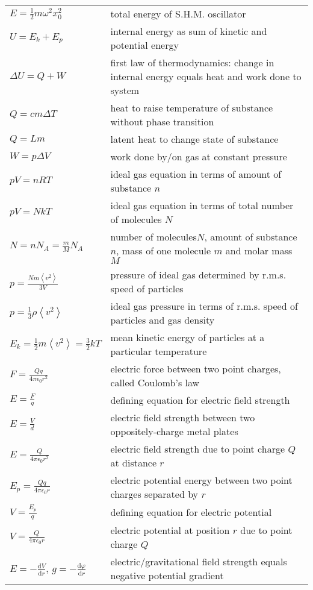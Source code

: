 {{\begin{longtable}{p{} p{}}
	$E=\frac{1}{2}m\omega^2 x_0^2$ & total energy of S.H.M. oscillator \\
	$U=E_k+E_p$ & internal energy as sum of kinetic and potential energy \\
	$\Delta U = Q + W$ & first law of thermodynamics: change in internal energy equals heat and work done to system \\
	$Q=cm\Delta T$ & heat to raise temperature of substance without phase transition \\
	$Q=Lm$ & latent heat to change state of substance \\
	$W=p\Delta V$ & work done by/on gas at constant pressure \\
	$pV=nRT$ & ideal gas equation in terms of amount of substance $n$\\
	$pV=NkT$ & ideal gas equation in terms of total number of molecules $N$\\
	$N=nN_A=\frac{m}{M}N_A$ & number of molecules$N$, amount of substance $n$, mass of one molecule $m$ and molar mass $M$ \\
	$p=\frac{Nm\left<v^2\right>}{3V}$ & pressure of ideal gas determined by r.m.s. speed of particles \\
	$p=\frac{1}{3}\rho\left<v^2\right>$ & ideal gas pressure in terms of r.m.s. speed of particles and gas density \\
	$E_k=\frac{1}{2}m\left<v^2\right>=\frac{3}{2}kT$ & mean kinetic energy of particles at a particular temperature \\
	$F=\frac{Qq}{4\pi\epsilon_0r^2}$ & electric force between two point charges, called Coulomb's law \\
	$E=\frac{F}{q}$ & defining equation for electric field strength \\
	$ E = \frac{V}{d}$ & electric field strength between two oppositely-charge metal plates \\
	$E =\frac{Q}{4\pi\epsilon_0r^2}$ & electric field strength due to point charge $Q$ at distance $r$\\
	$E_p=\frac{Qq}{4\pi\epsilon_0r}$ & electric potential energy between two point charges separated by $r$ \\
	$V=\frac{E_p}{q}$ & defining equation for electric potential \\
	$V=\frac{Q}{4\pi\epsilon_0r}$ & electric potential at position $r$ due to point charge $Q$ \\
	$E=-\frac{\mathrm{d}V}{\mathrm{d}r}$, $g=-\frac{\mathrm{d}\varphi}{\mathrm{d}r}$ & electric/gravitational field strength equals negative potential gradient \\

\end{longtable}}}
